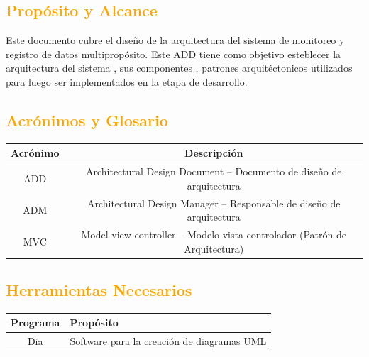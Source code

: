 \subsection{\textcolor{orange}{Propósito y Alcance}}
Este documento cubre el diseño de la arquitectura  del sistema
de monitoreo y registro de datos multipropósito. Este ADD tiene como objetivo
esteblecer la arquitectura del sistema , sus componentes , patrones
arquitéctonicos utilizados para luego ser implementados en la etapa de desarrollo.

\subsection{\textcolor{orange}{Acrónimos y Glosario}}
\begin{table}[!h]
\begin{center}
\begin{tabular}{|c|c|}
\hline
\rowcolor[RGB]{255,127,0} Acrónimo & Descripción \\
\hline
ADD & Architectural Design Document – Documento de diseño de arquitectura\\
\hline
ADM & Architectural Design Manager – Responsable de diseño de arquitectura\\
\hline
MVC & Model view controller – Modelo vista controlador (Patrón de
Arquitectura)\\
\hline
\end{tabular}
\end{center}
\end{table}

\subsection{\textcolor{orange}{Herramientas Necesarios}}
\begin{table}[!h]
\begin{center}
\begin{tabular}{|c|p{100mm}|}
\hline
\rowcolor[RGB]{255,127,0} Programa & Propósito \\
\hline
Dia & Software para la creación de diagramas UML \\
\hline
\end{tabular}
\end{center}
\end{table}



